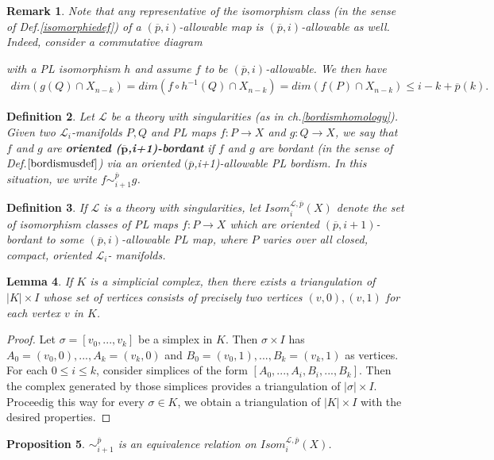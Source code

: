 \documentclass{scrreprt}
\newtheorem{prop}{Proposition}[chapter]
\newtheorem{lemma}[prop]{Lemma}
\newtheorem{definition}[prop]{Definition}
\newtheorem{remark}[prop]{Remark}
\begin{document}
\begin{remark}
Note that any representative of the isomorphism class (in the sense of Def.\ref{isomorphiedef}) of a $(\overline{p},i)$-allowable map is $(\overline{p},i)$-allowable as well. Indeed, consider a commutative diagram
\begin{xy}
\end{xy}
with a PL isomorphism $h$ and assume $f$ to be $(\overline{p},i)$-allowable. We then have
\begin{align*}
dim(g(Q) \cap X_{n-k}) = dim(f \circ h^{-1} (Q) \cap X_{n-k})=dim(f(P) \cap X_{n-k}) \leq i-k+ \overline{p}(k).
\end{align*}
\end{remark}

\begin{definition}
Let $\mathcal{L}$ be a theory with singularities (as in ch.\ref{bordismhomology}). Given two $\mathcal{L}_i$-manifolds $P,Q$ and PL maps $f: P \to X$ and $g: Q \to X$, we say that $f$ and $g$ are \textbf{oriented ($\boldsymbol{\overline{p}}$,i+1)-bordant} if $f$ and $g$ are bordant (in the sense of Def.$\ref{bordismusdef}$) via an oriented $({\overline{p}}$,i+1)-allowable PL bordism. In this situation, we write $f \sim_{i+1}^{\overline{p}} g$.
\end{definition}

\begin{definition}
If $\mathcal{L}$ is a theory with singularities, let $Isom_i^{\mathcal{L}, \overline{p}}(X)$ denote the set of isomorphism classes of PL maps $f: P \to X$ which are oriented $(\overline{p},i+1)$-bordant to some $(\overline{p},i)$-allowable PL map, where $P$ varies over all closed, compact, oriented $\mathcal{L}_i$- manifolds.
\end{definition}

\begin{lemma}\label{producttriangulation}
If $K$ is a simplicial complex, then there exists a triangulation of $|K| \times I$ whose set of vertices consists of precisely two vertices $(v,0), (v,1)$ for each vertex $v$ in $K$.
\end{lemma}

\begin{proof}
Let $\sigma=[v_0,...,v_k]$ be a simplex in $K$. Then $\sigma \times I$ has $A_0=(v_0,0),...,A_k=(v_k,0)$ and $B_0=(v_0,1),...,B_k=(v_k,1)$ as vertices. For each $0 \leq i \leq k$, consider simplices of the form $[A_0,...,A_i,B_i,...,B_k]$. Then the complex generated by those simplices provides a triangulation of $| \sigma| \times I$. Proceedig this way for every $\sigma \in K$, we obtain a triangulation of $|K| \times I$ with the desired properties.
\end{proof}
\begin{prop}\label{intersectioneqrelation}
$\sim_{i+1}^{\overline{p}}$ is an equivalence relation on $Isom_i^{\mathcal{L}, \overline{p}}(X)$.
\end{prop}
\end{document}
